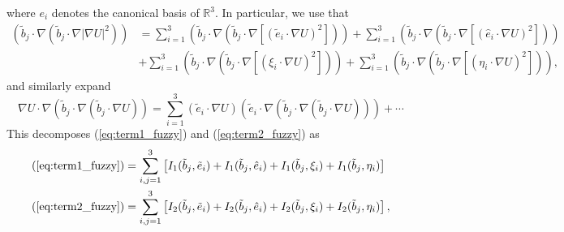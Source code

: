 \documentclass[10pt,oneside]{amsart}
\numberwithin{equation}{section}
\numberwithin{definition}{section}
\numberwithin{theorem}{section}
\numberwithin{lemma}{section}
\begin{document}
%
where $e_{i}$ denotes the canonical basis of $\mathbb{R}^{3}$. In particular, we use that
%
\begin{align*}
  \left(\tilde{b}_{j}\cdot\nabla\left(\tilde{b}_{j}\cdot\nabla\left|\nabla U\right|^{2}\right)\right)&
  = \sum_{i=1}^{3}\left(\tilde{b}_{j}\cdot\nabla\left(\tilde{b}_{j}\cdot\nabla\left[(\tilde{e}_{i}\cdot\nabla U)^{2}\right]\right)\right)
  +\sum_{i=1}^{3}\left(\tilde{b}_{j}\cdot\nabla\left(\tilde{b}_{j}\cdot\nabla\left[(\hat{e}_{i}\cdot\nabla U)^{2}\right]\right)\right)	\\
  & + \sum_{i=1}^{3}\left(\tilde{b}_{j}\cdot\nabla\left(\tilde{b}_{j}\cdot\nabla\left[(\xi_i\cdot\nabla U)^{2}\right]\right)\right)
  +\sum_{i=1}^{3}\left(\tilde{b}_{j}\cdot\nabla\left(\tilde{b}_{j}\cdot\nabla\left[(\eta_i\cdot\nabla U)^{2}\right]\right)\right),
\end{align*}
%
and similarly expand
%
\begin{equation*}
  \nabla U\cdot\nabla\left(\tilde{b}_{j}\cdot\nabla\left(\tilde{b}_{j}\cdot\nabla U\right)\right) 
  = \sum_{i=1}^{3}(\tilde{e}_{i}\cdot\nabla U)\left(\tilde{e}_{i}\cdot\nabla\left(\tilde{b}_{j}\cdot\nabla\left(\tilde{b}_{j}\cdot\nabla U\right)\right)\right) + \cdots
\end{equation*}
%
This decomposes (\ref{eq:term1_fuzzy}) and (\ref{eq:term2_fuzzy}) as
%
\begin{align*}
  (\ref{eq:term1_fuzzy}) & = \sum_{i,j=1}^3
  \left[I_1(\tilde b_j,\tilde e_i) + I_1(\tilde b_j,\hat e_i) + I_1(\tilde b_j,\xi_i) + I_1(\tilde b_j,\eta_i)\right]	\\
  (\ref{eq:term2_fuzzy}) & = \sum_{i,j=1}^3
  \left[I_2(\tilde b_j,\tilde e_i) + I_2(\tilde b_j,\hat e_i) + I_2(\tilde b_j,\xi_i) + I_2(\tilde b_j,\eta_i)\right],
\end{align*}
\end{document}
